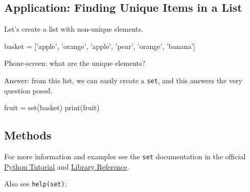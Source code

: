 \documentclass[12pt,letterpaper,twoside]{article}
\begin{document}
\subsection{Application: Finding Unique Items in a List}

Let's create a list with non-unique elements.

\begin{python}
basket = ['apple', 'orange', 'apple', 'pear', 'orange', 'banana']
\end{python}

Phone-screen: what are the unique elements?

Answer: from this list, we can easily create a \texttt{set}, and this answers the very question posed.

\begin{python}
fruit = set(basket)
print(fruit)
\end{python}

\subsection{Methods}

For more information and examples see the \texttt{set} documentation in
the official \href{https://docs.python.org/3/tutorial/datastructures.html\#sets}{Python
Tutorial} and
\href{https://docs.python.org/3/library/stdtypes.html\#set-types-set-frozenset}{Library
Reference}.

Also see \texttt{help(set)}:
\end{document}
